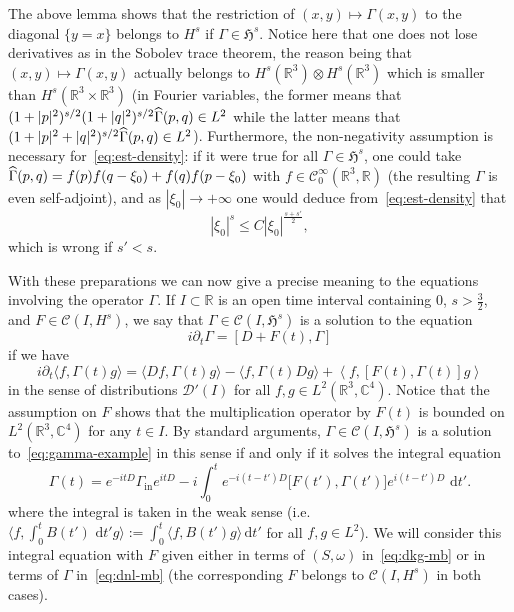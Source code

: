 \documentclass[AHL,Unicode,longabstracts,published]{cedram}
\newcommand{\rmin}{\mathrm{in}}
\newcommand{\cD}{\mathcal{D}}
\newcommand{\cC}{\mathcal{C}}
\newcommand\R{\mathbb{R}}
\newcommand\C{\mathbb{C}}
\renewcommand\hat{\widehat}
\newcommand{\gH}{\mathfrak{H}}
\newcommand\ii{{\ensuremath {\infty}}}
\renewcommand\d[1]{{\ensuremath{\,\text{d}#1}}}
\let\oldhat\hat
\renewcommand*{\hat}[1]{\mathchoice{\widehat{#1}}{\widehat{#1}}{\oldhat{#1}}{\oldhat{#1}}}
\begin{document}
\begin{rema}
The above lemma shows that the restriction of $(x,y)\mapsto\Gamma(x,y)$ to the diagonal $\{y=x\}$ belongs to $H^s$ if $\Gamma\in\gH^s$. Notice here that one does not lose derivatives as in the Sobolev trace theorem, the reason being that $(x,y)\mapsto \Gamma(x,y)$ actually belongs to $H^s(\R^3)\otimes H^s(\R^3)$ which is smaller than $H^s(\R^3\times\R^3)$ (in Fourier variables, the former means that $(1+|p|^2)^{s/2}(1+|q|^2)^{s/2}\hat{\Gamma}(p,q)\in L^2$ while the latter means that $(1+|p|^2+|q|^2)^{s/2}\hat{\Gamma}(p,q)\in L^2$). Furthermore, the non-negativity assumption is necessary for~\eqref{eq:est-density}: if it were true for all $\Gamma\in\gH^s$, one could take $\hat{\Gamma}(p,q)=f(p)f(q-\xi_0)+f(q)f(p-\xi_0)$ with $f\in \cC^\ii_0(\R^3,\R)$ (the resulting $\Gamma$ is even self-adjoint), and as $|\xi_0|\to+\ii$ one would deduce from~\eqref{eq:est-density} that
\[
|\xi_0|^{s}\leq C|\xi_0|^{\frac{s+s'}{2}},
\]
which is wrong if $s'<s$.
\end{rema}

With these preparations we can now give a precise meaning to the equations involving the operator $\Gamma$. If $I\subset\R$ is an open time interval containing $0$, $s>\tfrac32$, and $F\in \cC(I,H^s)$, we say that $\Gamma\in \cC(I,\gH^s)$ is a solution to the equation
\begin{equation}\label{eq:gamma-example}
i\partial_t\Gamma=[D+F(t),\Gamma]
\end{equation}
if we have
\[
i\partial_t \langle f,\Gamma(t) g\rangle = \langle Df,\Gamma(t) g\rangle - \langle f,\Gamma(t) Dg\rangle + \left\langle f,[F(t),\Gamma(t)]g\right\rangle
\]
in the sense of distributions $\cD'(I)$ for all $f,g\in L^2(\R^3,\C^4)$. Notice that the assumption on $F$ shows that the multiplication operator by $F(t)$ is bounded on $L^2(\R^3,\C^4)$ for any $t\in I$. By standard arguments, $\Gamma\in \cC(I,\gH^s)$ is a solution to~\eqref{eq:gamma-example} in this sense if and only if it solves the integral equation
\begin{equation}
\Gamma(t)= e^{-itD} \Gamma_{\rmin} e^{itD} - i\int_0^te^{-i(t-t')D}\big[F(t'),\Gamma(t')\big]e^{i(t-t')D}\,\d t'.
\end{equation}
where the integral is taken in the weak sense (i.e. $\langle f,\int_0^t B(t')\,\d t' g\rangle := \int_0^t \langle f,B(t') g\rangle \d t'$ for all $f,g\in L^2$). We will consider this integral equation with $F$ given either in terms of $(S,\omega)$ in~\eqref{eq:dkg-mb} or in terms of $\Gamma$ in~\eqref{eq:dnl-mb} (the corresponding $F$ belongs to $\cC(I,H^s)$ in both cases).
\end{document}
